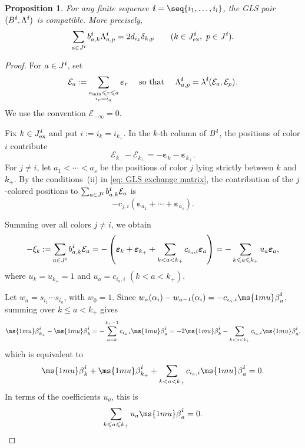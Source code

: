 \documentclass[12pt, leqno]{amsart}
\numberwithin{equation}{section}
\theoremstyle{plain}
\newtheorem{proposition}[lemma]{Proposition}
\theoremstyle{definition}
\renewcommand{\le}{\leqslant}
\newcommand{\seteq}{\mathbin{:=}}
\newcommand{\ex}{\mathrm{ex}}
\newcommand{\be}{{\ms{1mu}\beta}}
\newcommand{\ve}{\boldsymbol{\varepsilon}}
\newcommand{\ii}{ \textbf{\textit{i}}}
\newcommand{\calE}{\mathcal{E}}
\begin{document}
\begin{proposition}\label{prop: compatibility arbitrary sequence}
For any finite sequence $\ii=\seq{i_1,\ldots,i_l}$,
the GLS pair $(B^\ii,\Lambda^\ii)$ is compatible. More precisely,
\[
\sum_{a\in J^\ii} b^\ii_{a,k}\Lambda^\ii_{a,p}
= 2d_{i_k}\delta_{k,p} \qquad (k\in J^\ii_{\ex},\ p\in J^\ii).
\]
\end{proposition}

\begin{proof}
For $a\in J^\ii$, set
\begin{equation}\label{eq: big epsilon}
\calE_a \seteq \sum_{\substack{a_{\min}\le r\le a\\ i_r=i_a}}\ve_r \quad \text{ so that } \quad
\Lambda^\ii_{a,p} = \lambda^\ii(\calE_a,\calE_p).
\end{equation}
We use the convention $\calE_{-\infty}=0$.

Fix $k\in J^\ii_{\ex}$ and put $i\seteq i_k=i_{k_+}$.
In the $k$-th column of $B^\ii$, the positions of color $i$
contribute
\[
\calE_{k_-}-\calE_{k_+}=-\ve_k-\ve_{k_+}.
\]
For $j\neq i$, let $a_1<\cdots<a_s$ be the positions of color $j$
lying strictly between $k$ and $k_+$.
By the conditions~{\rm (ii)} in \eqref{eq: GLS exchange matrix}, the
contribution of the $j$-colored positions to
$\sum_{a\in J^\ii}b^\ii_{a,k}\calE_a$ is
\[
-c_{j,i}(\ve_{a_1}+\cdots+\ve_{a_s}).
\]

Summing over all colors $j\neq i$, we obtain
\begin{equation}\label{eq: B column telescoping}
-\xi_k \seteq \sum_{a\in J^\ii}b^\ii_{a,k}\calE_a = -\left( \ve_k+\ve_{k_+} +\sum_{k<a<k_+}c_{i_a,i}\ve_a \right)
= -\sum_{k\le a\le k_+}u_a\ve_a,
\end{equation}
where $u_k=u_{k_+}=1$ and  $u_a=c_{i_a,i}$ $(k<a<k_+)$.

Let $w_a=s_{i_1}\cdots s_{i_a}$, with $w_0=1$. Since $w_a(\alpha_i)-w_{a-1}(\alpha_i) =-c_{i_a,i}\be_a^\ii$,
summing over $k\le a<k_+$ gives
\[
\be_{k_+}^\ii-\be_k^\ii = -\sum_{a=k}^{k_+-1}c_{i_a,i}\be_a^\ii = -2\be_k^\ii -\sum_{k<a<k_+}c_{i_a,i}\be_a^\ii,
\]
which is equivalent to
\begin{equation}\label{eq: root telescoping compatibility}
\be_k^\ii+\be_{k_+}^\ii
+\sum_{k<a<k_+}c_{i_a,i}\be_a^\ii
=0.
\end{equation}
In terms of the coefficients $u_a$, this is
\begin{equation}\label{eq: root telescoping u}
\sum_{k\le a\le k_+}u_a\be_a^\ii=0.
\end{equation}


\end{proof}
\end{document}
